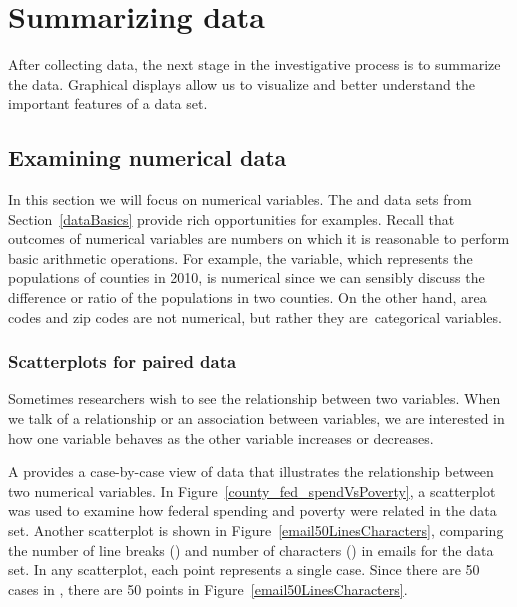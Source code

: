 \chapter{Summarizing data}
\label{summarizingData}

After collecting data, the next stage in the investigative process is to summarize the data. Graphical displays allow us to visualize and better understand the important features of a data set.

\section[Examining numerical data]{Examining numerical data }
\label{numericalData}
In this section we will focus on numerical variables. The  and  data sets from Section~\ref{dataBasics} provide rich opportunities for examples. Recall that outcomes of numerical variables are numbers on which it is reasonable to perform basic arithmetic operations. For example, the  variable, which represents the populations of counties in 2010, is numerical since we can sensibly discuss the difference or ratio of the populations in two counties. On the other hand, area codes and zip codes are not numerical, but rather they are~categorical variables.


\subsection{Scatterplots for paired data}
\label{scatterPlots}


Sometimes researchers wish to see the relationship between two variables. When we talk of a relationship or an association between variables, we are interested in how one variable behaves as the other variable increases or decreases.

A  provides a case-by-case view of data that illustrates the relationship between two numerical variables. In Figure~\vref{county_fed_spendVsPoverty}, a scatterplot was used to examine how federal spending and poverty were related in the  data set. Another scatterplot is shown in Figure~\ref{email50LinesCharacters}, comparing the number of line breaks () and number of characters () in emails for the  data set. In any scatterplot, each point represents a single case. Since there are 50 cases in , there are 50 points in Figure~\ref{email50LinesCharacters}.


